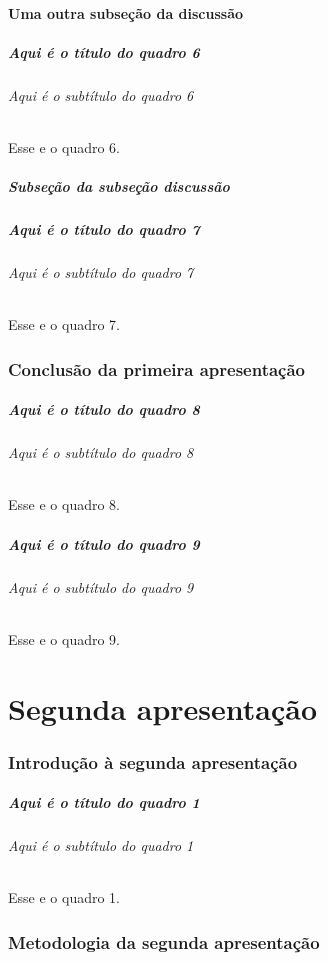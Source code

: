 \documentclass[aspectratio=169]{beamer}
\begin{document}
				\subsection{Uma outra subseção da discussão}
					\begin{frame}
						\frametitle{Aqui é o título do quadro 6}
						\framesubtitle{Aqui é o subtítulo do quadro 6}
						Esse e o quadro 6.
					\end{frame}
			
			\subsubsection{Subseção da subseção discussão}
				\begin{frame}
					\frametitle{Aqui é o título do quadro 7}
					\framesubtitle{Aqui é o subtítulo do quadro 7}
					Esse e o quadro 7.
				\end{frame}
		
		\section[Conclusão]{Conclusão da primeira apresentação}
			\begin{frame}
				\frametitle{Aqui é o título do quadro 8}
				\framesubtitle{Aqui é o subtítulo do quadro 8}
				Esse e o quadro 8.
			\end{frame}
			\begin{frame}
				\frametitle{Aqui é o título do quadro 9}
				\framesubtitle{Aqui é o subtítulo do quadro 9}
				Esse e o quadro 9.
			\end{frame}
		
	\part{Segunda apresentação}
		\section[Introdução]{Introdução à segunda apresentação}
			\begin{frame}
				\frametitle{Aqui é o título do quadro 1}
				\framesubtitle{Aqui é o subtítulo do quadro 1}
				Esse e o quadro 1.
			\end{frame}	
		
		\section[Metodologia]{Metodologia da segunda apresentação}
\end{document}

